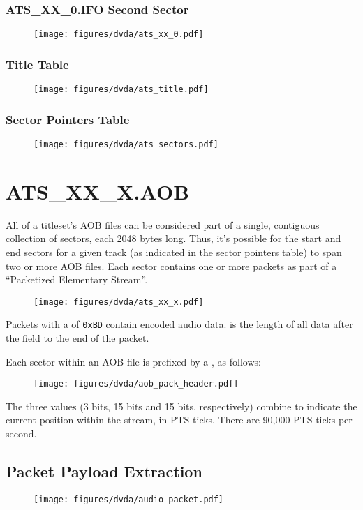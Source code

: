 \clearpage

\subsubsection{ATS\_XX\_0.IFO Second Sector}
\begin{figure}[h]
\texttt{[image: figures/dvda/ats\_xx\_0.pdf]}
\end{figure}

\subsubsection{Title Table}
\begin{figure}[h]
  \texttt{[image: figures/dvda/ats\_title.pdf]}
\end{figure}

\subsubsection{Sector Pointers Table}
\begin{figure}[h]
  \texttt{[image: figures/dvda/ats\_sectors.pdf]}
\end{figure}

\clearpage

\section{ATS\_XX\_X.AOB}

All of a titleset's AOB files can be considered part of a
single, contiguous collection of sectors, each 2048 bytes long.
Thus, it's possible for the start and end sectors for a given track
(as indicated in the sector pointers table) to span two or more
AOB files.
Each sector contains one or more packets as part of a
``Packetized Elementary Stream''.

\begin{figure}[h]
  \texttt{[image: figures/dvda/ats\_xx\_x.pdf]}
\end{figure}
\par
\noindent
Packets with a  of \texttt{0xBD} contain encoded audio data.
 is the length of all data after
the  field to the end of the packet.
\par
\noindent
Each sector within an AOB file is prefixed by a ,
as follows:
\begin{figure}[h]
  \texttt{[image: figures/dvda/aob\_pack\_header.pdf]}
\end{figure}
\par
\noindent
The three  values (3 bits, 15 bits and 15 bits, respectively)
combine to indicate the current position within the stream, in PTS ticks.
There are 90,000 PTS ticks per second.

\clearpage

\subsection{Packet Payload Extraction}

\begin{figure}[h]
  \texttt{[image: figures/dvda/audio\_packet.pdf]}
\end{figure}
